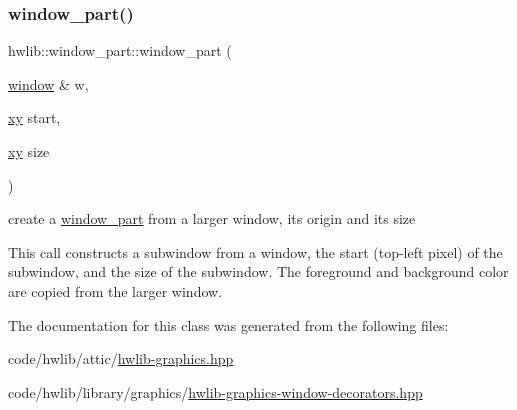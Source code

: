 \subsubsection{\texorpdfstring{window\+\_\+part()}{window\_part()}\hspace{0.1cm}{\footnotesize\ttfamily [2/2]}}
{\footnotesize\ttfamily hwlib\+::window\+\_\+part\+::window\+\_\+part (\begin{DoxyParamCaption}\item[{\hyperlink{classhwlib_1_1window}{window} \&}]{w,  }\item[{\hyperlink{classhwlib_1_1xy}{xy}}]{start,  }\item[{\hyperlink{classhwlib_1_1xy}{xy}}]{size }\end{DoxyParamCaption})\hspace{0.3cm}{\ttfamily [inline]}}

create a \hyperlink{classhwlib_1_1window__part}{window\+\_\+part} from a larger window, its origin and its size

This call constructs a subwindow from a window, the start (top-\/left pixel) of the subwindow, and the size of the subwindow. The foreground and background color are copied from the larger window. 

The documentation for this class was generated from the following files\+:\begin{DoxyCompactItemize}
\item 
code/hwlib/attic/\hyperlink{hwlib-graphics_8hpp}{hwlib-\/graphics.\+hpp}\item 
code/hwlib/library/graphics/\hyperlink{hwlib-graphics-window-decorators_8hpp}{hwlib-\/graphics-\/window-\/decorators.\+hpp}\end{DoxyCompactItemize}
